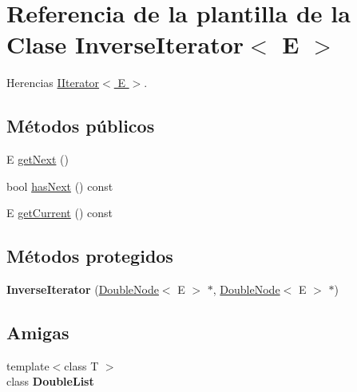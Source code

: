 \hypertarget{classInverseIterator}{\section{Referencia de la plantilla de la Clase Inverse\-Iterator$<$ E $>$}
\label{classInverseIterator}
}


Herencias \hyperlink{classIIterator}{I\-Iterator$<$ E $>$}.

\subsection*{Métodos públicos}
\begin{DoxyCompactItemize}
\item 
E \hyperlink{classInverseIterator_a4c1d8ceb8264f7f8186b6244a0a62940}{get\-Next} ()
\item 
bool \hyperlink{classInverseIterator_a86973781dfa84df67be2843fc4545692}{has\-Next} () const 
\item 
E \hyperlink{classInverseIterator_afdbb5c310621c773da10dfb5bc3b1a4c}{get\-Current} () const 
\end{DoxyCompactItemize}
\subsection*{Métodos protegidos}
\begin{DoxyCompactItemize}
\item 
\hypertarget{classInverseIterator_a31703976cbdca73a1035f47509e8229d}{{\bfseries Inverse\-Iterator} (\hyperlink{classDoubleNode}{Double\-Node}$<$ E $>$ $\ast$, \hyperlink{classDoubleNode}{Double\-Node}$<$ E $>$ $\ast$)}\label{classInverseIterator_a31703976cbdca73a1035f47509e8229d}

\end{DoxyCompactItemize}
\subsection*{Amigas}
\begin{DoxyCompactItemize}
\item 
\hypertarget{classInverseIterator_ad435a9844a002995926acf522128f7a8}{{\footnotesize template$<$class T $>$ }\\class {\bfseries Double\-List}}\label{classInverseIterator_ad435a9844a002995926acf522128f7a8}

\end{DoxyCompactItemize}


